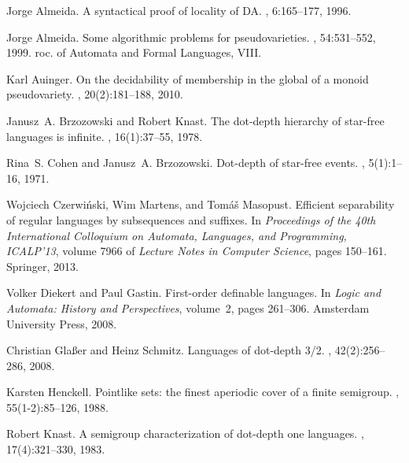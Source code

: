 \documentclass[a4paper,USenglish]{lipics}
\theoremstyle{plain}
\begin{document}
\begin{thebibliography}{10}

Jorge Almeida.
\newblock A syntactical proof of locality of {DA}.
, 6:165--177,
  1996.

Jorge Almeida.
\newblock Some algorithmic problems for pseudovarieties.
, 54:531--552, 1999.
roc. of {Automata and Formal Languages, VIII}.

Karl Auinger.
\newblock On the decidability of membership in the global of a monoid
  pseudovariety.
,
  20(2):181--188, 2010.

Janusz~A. Brzozowski and Robert Knast.
\newblock The dot-depth hierarchy of star-free languages is infinite.
, 16(1):37--55, 1978.

Rina~S. Cohen and Janusz~A. Brzozowski.
\newblock Dot-depth of star-free events.
, 5(1):1--16, 1971.

Wojciech Czerwi\'nski, Wim Martens, and Tom\'a{\v s} Masopust.
\newblock Efficient separability of regular languages by subsequences and
  suffixes.
\newblock In {\em Proceedings of the 40th International Colloquium on Automata,
  Languages, and Programming, ICALP'13}, volume 7966 of {\em Lecture Notes in
  Computer Science}, pages 150--161. Springer, 2013.

Volker Diekert and Paul Gastin.
\newblock First-order definable languages.
\newblock In {\em Logic and Automata: History and Perspectives}, volume~2,
  pages 261--306. Amsterdam University Press, 2008.

Christian Gla{\ss}er and Heinz Schmitz.
\newblock Languages of dot-depth 3/2.
, 42(2):256--286, 2008.

Karsten Henckell.
\newblock Pointlike sets: the finest aperiodic cover of a finite semigroup.
, 55(1-2):85--126, 1988.

Robert Knast.
\newblock A semigroup characterization of dot-depth one languages.
, 17(4):321--330,
  1983.


\end{thebibliography}
\end{document}
